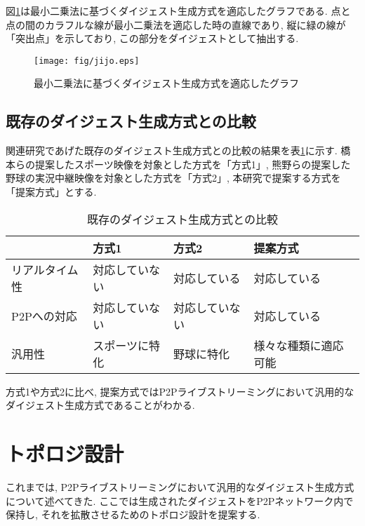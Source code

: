 図\ref{fig:jijo}は最小二乗法に基づくダイジェスト生成方式を適応したグラフである. 点と点の間のカラフルな線が最小二乗法を適応した時の直線であり, 縦に緑の線が「突出点」を示しており, この部分をダイジェストとして抽出する.

\begin{figure}[h]
  \centering
  \texttt{[image: fig/jijo.eps]}
  \caption{最小二乗法に基づくダイジェスト生成方式を適応したグラフ}
  \label{fig:jijo}
\end{figure}

\newpage

\subsection{既存のダイジェスト生成方式との比較}
関連研究であげた既存のダイジェスト生成方式との比較の結果を表\ref{tbl:compare-digest}に示す. 橋本らの提案したスポーツ映像を対象とした方式を「方式1」, 熊野らの提案した野球の実況中継映像を対象とした方式を「方式2」, 本研究で提案する方式を「提案方式」とする.

\begin{table}[h]
  \caption{既存のダイジェスト生成方式との比較}
  \label{tbl:compare-digest}
  \centering
      {\small
        \begin{tabular}{|l|l|l|l|}
          \hline
          & 方式1 & 方式2 & 提案方式 \\ \hline \hline
          リアルタイム性 & 対応していない & 対応している & 対応している \\ \hline
          P2Pへの対応 & 対応していない & 対応していない & 対応している \\ \hline
          汎用性 & スポーツに特化 & 野球に特化 & 様々な種類に適応可能 \\ \hline
        \end{tabular}
      }
\end{table}

方式1や方式2に比べ, 提案方式ではP2Pライブストリーミングにおいて汎用的なダイジェスト生成方式であることがわかる.

\section{トポロジ設計}
これまでは, P2Pライブストリーミングにおいて汎用的なダイジェスト生成方式について述べてきた. ここでは生成されたダイジェストをP2Pネットワーク内で保持し, それを拡散させるためのトポロジ設計を提案する.

